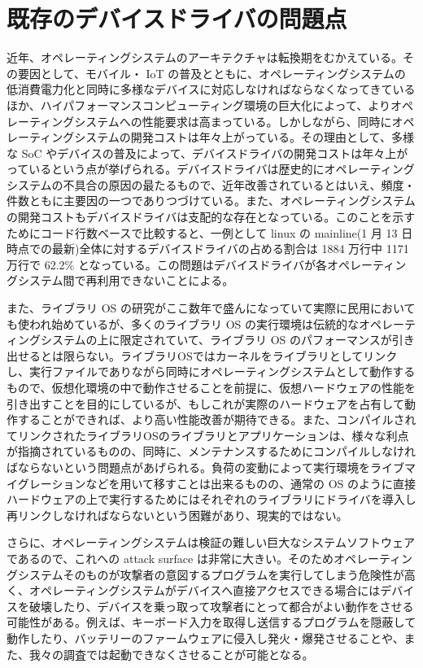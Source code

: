 \documentclass[a4paper,11pt,report]{ltjsbook}
\begin{document}
\section{既存のデバイスドライバの問題点}
近年、オペレーティングシステムのアーキテクチャは転換期をむかえている。その要因として、モバイル・ IoT の普及とともに、オペレーティングシステムの低消費電力化と同時に多様なデバイスに対応しなければならなくなってきているほか、ハイパフォーマンスコンピューティング環境の巨大化によって、よりオペレーティングシステムへの性能要求は高まっている。しかしながら、同時にオペレーティングシステムの開発コストは年々上がっている。その理由として、多様な SoC やデバイスの普及によって、デバイスドライバの開発コストは年々上がっているという点が挙げられる。デバイスドライバは歴史的にオペレーティングシステムの不具合の原因の最たるもので\cite{oserrors}、近年改善されているとはいえ、頻度・件数ともに主要因の一つでありつづけている\cite{faults}。また、オペレーティングシステムの開発コストもデバイスドライバは支配的な存在となっている。このことを示すためにコード行数ベースで比較すると、一例として linux の mainline(1 月 13 日時点での最新)全体に対するデバイスドライバの占める割合は 1884 万行中 1171 万行で 62.2\% となっている。この問題はデバイスドライバが各オペレーティングシステム間で再利用できないことによる。

また、ライブラリ OS の研究がここ数年で盛んになっていて実際に民用においても使われ始めているが、多くのライブラリ OS の実行環境は伝統的なオペレーティングシステムの上に限定されていて、ライブラリ OS のパフォーマンスが引き出せるとは限らない。ライブラリOSではカーネルをライブラリとしてリンクし、実行ファイルでありながら同時にオペレーティングシステムとして動作するもので、仮想化環境の中で動作させることを前提に、仮想ハードウェアの性能を引き出すことを目的にしているが、もしこれが実際のハードウェアを占有して動作することができれば、より高い性能改善が期待できる。また、コンパイルされてリンクされたライブラリOSのライブラリとアプリケーションは、様々な利点が指摘されているものの、同時に、メンテナンスするためにコンパイルしなければならないという問題点があげられる。負荷の変動によって実行環境をライブマイグレーションなどを用いて移すことは出来るものの、通常の OS のように直接ハードウェアの上で実行するためにはそれぞれのライブラリにドライバを導入し再リンクしなければならないという困難があり、現実的ではない。%

さらに、オペレーティングシステムは検証の難しい巨大なシステムソフトウェアであるので、これへの attack surface は非常に大きい。そのためオペレーティングシステムそのものが攻撃者の意図するプログラムを実行してしまう危険性が高く、オペレーティングシステムがデバイスへ直接アクセスできる場合にはデバイスを破壊したり、デバイスを乗っ取って攻撃者にとって都合がよい動作をさせる可能性がある。例えば、キーボード入力を取得し送信するプログラムを隠蔽して動作したり\cite{thinkpadkeyvlnt}、バッテリーのファームウェアに侵入し発火・爆発させることや\cite{macbookbatvlnt}、また、我々の調査では起動できなくさせることが可能となる。
\end{document}
